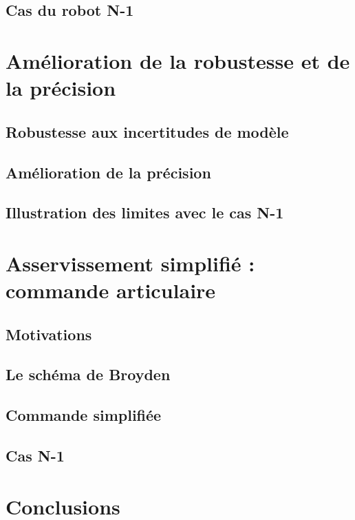 \subsection{Cas du robot N-1}

\section{Amélioration de la robustesse et de la précision}

\subsection{Robustesse aux incertitudes de modèle}

\subsection{Amélioration de la précision}

\subsection{Illustration des limites avec le cas N-1}


\section{Asservissement simplifié : commande articulaire}

\subsection{Motivations}

\subsection{Le schéma de Broyden}

\subsection{Commande simplifiée}

\subsection{Cas N-1}

\section{Conclusions}